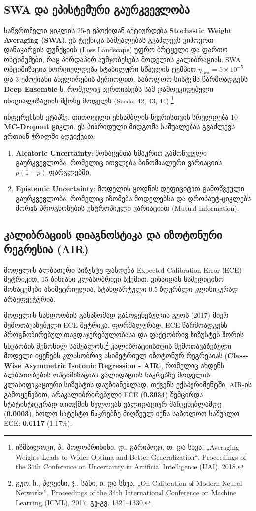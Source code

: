 \documentclass[12pt,a4paper,oneside]{report}
\begin{document}
\subsection{SWA და ეპისტემური გაურკვევლობა}
საწვრთნელი ციკლის 25-ე ეპოქიდან აქტიურდება \textbf{Stochastic Weight Averaging (SWA)}. ეს ტექნიკა საშუალებას გვაძლევს ვიპოვოთ დანაკარგის ფუნქციის (Loss Landscape) უფრო ბრტყელი და ფართო ოპტიმუმები, რაც პირდაპირ აუმჯობესებს მოდელის კალიბრაციას. SWA ოპტიმიზაცია ხორციელდება სტაბილური სწავლის ტემპით $\eta_{\text{swa}} = 5 \times 10^{-5}$ და $3$-ეპოქიანი ანელირების პერიოდით. საბოლოო სისტემა წარმოადგენს \textbf{Deep Ensemble}-ს, რომელიც აერთიანებს სამ დამოუკიდებელი ინიციალიზაციის მქონე მოდელს (Seeds: 42, 43, 44).\footnote{იზმაილოვი, პ., პოდოპრიხინი, დ., გარიპოვი, თ. და სხვა, „Averaging Weights Leads to Wider Optima and Better Generalization“, Proceedings of the 34th Conference on Uncertainty in Artificial Intelligence (UAI), 2018.}

ინფერენსის ეტაპზე, თითოეული ენსამბლის წევრისთვის სრულდება 10 \textbf{MC-Dropout} ციკლი. ეს ჰიბრიდული მიდგომა საშუალებას გვაძლევს ერთიან ჭრილში აღვიქვათ:
\begin{enumerate}[leftmargin=1.6em]
    \item \textbf{Aleatoric Uncertainty}: მონაცემთა ხმაურით გამოწვეული გაურკვევლობა, რომელიც ითვლება ბინომიალური ვარიაციის $p(1-p)$ ფარგლებში;
    \item \textbf{Epistemic Uncertainty}: მოდელის ცოდნის დეფიციტით გამოწვეული გაურკვევლობა, რომელიც იზომება მოდელებსა და დროპაუტ-ციკლებს შორის პროგნოზების ენტროპიული ვარიაციით (Mutual Information).
\end{enumerate}

\subsection{კალიბრაციის დიაგნოსტიკა და იზოტონური რეგრესია (AIR)}
მოდელის ალბათური სიზუსტე ფასდება Expected Calibration Error (ECE) მეტრიკით, 15-ბინიანი კლასობრივი სქემით. ვინაიდან სამედიცინო მონაცემები ასიმეტრიულია, სტანდარტული 0.5 ზღურბლი კლინიკურად არაეფექტურია. 

მოდელის სანდოობის გასაზომად გამოყენებულია გუოს (2017) მიერ შემოთავაზებული ECE მეტრიკა. ფორმალურად, ECE წარმოადგენს პროგნოზირებულ თავდაჯერებულობასა და ფაქტობრივ სიზუსტეს შორის სხვაობის შეწონილ საშუალოს.\footnote{გუო, ჩ., პლეისი, ჯ., სანი, ი. და სხვა, „On Calibration of Modern Neural Networks“, Proceedings of the 34th International Conference on Machine Learning (ICML), 2017. გვ-გვ. 1321–1330.} კალიბრაციისთვის შემოთავაზებული მოდელი იყენებს კლასობრივ ასიმეტრიულ იზოტონურ რეგრესიას (\textbf{Class-Wise Asymmetric Isotonic Regression - AIR}), რომელიც ახდენს ალბათობების ოპტიმიზაციას ვალიდაციის ნაკრებზე მოდელის კლასიფიკაციური სიზუსტის დაუზიანებლად. თქვენს ექსპერიმენტში, AIR-ის გამოყენებით, არაკალიბრირებული ECE (\textbf{0.3034}) შემცირდა სტატისტიკურად თითქმის ნულოვან ვალიდაციურ მაჩვენებლამდე (\textbf{0.0003}), ხოლო სატესტო ნაკრებზე მიღწეულ იქნა საბოლოო საშუალო ECE: \textbf{0.0117} (1.17\%).
\end{document}
